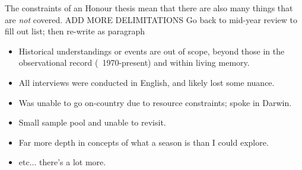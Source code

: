 The constraints of an Honour thesis mean that there are also many things
that are \emph{not} covered.  ADD MORE DELIMITATIONS
%
Go back to mid-year review to fill out list; then re-write as paragraph
%
\begin{itemize}
\item Historical understandings or events are out of scope, beyond those
        in the observational record (~1970-present) and within living memory.
\item All interviews were conducted in English, and likely lost some nuance.
\item Was unable to go on-country due to resource constraints; spoke in Darwin.
\item Small sample pool and unable to revisit.
\item Far more depth in concepts of what a season is than I could explore.
\item etc... there's a lot more.
\end{itemize}




